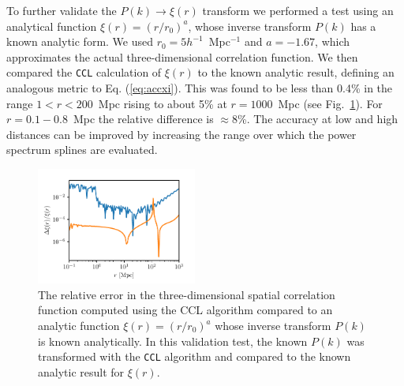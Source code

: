 \documentclass[\docopts]{\docclass}
\newcommand{\ccl}{{\tt CCL}\xspace}
\begin{document}
To further validate the $P(k) \to \xi(r)$ transform we performed a test using an analytical function $\xi(r) = (r / r_0)^a$, whose inverse transform $P(k)$ has a known analytic form. We used $r_0 = 5 h^{-1}$~Mpc$^{-1}$ and $a = -1.67$, which approximates the actual three-dimensional correlation function.  We then compared the \ccl calculation of $\xi(r)$ to the known analytic result, defining an analogous metric to Eq. (\ref{eq:accxi}). This was found to be less than 0.4\% in the range $1 < r < 200$~Mpc rising to about 5\% at $r = 1000$~Mpc (see Fig.~\ref{fig:analytic_xi}). For $r=0.1-0.8$~Mpc the relative difference is $\approx$8\%. The accuracy at low and high distances can be improved by increasing the range over which the power spectrum splines are evaluated.
%
\begin{figure}[htbp]
\centering
\includegraphics[width=0.47\textwidth]{3dcorr_analytic}
\caption{The relative error in the three-dimensional spatial correlation function computed using the CCL algorithm compared to an analytic function $\xi(r) = (r/r_0)^a$ whose inverse transform $P(k)$ is known analytically. In this validation test, the known $P(k)$ was transformed with the \ccl algorithm and compared to the known analytic result for $\xi(r)$.}
\label{fig:analytic_xi}
\end{figure}

\end{document}
